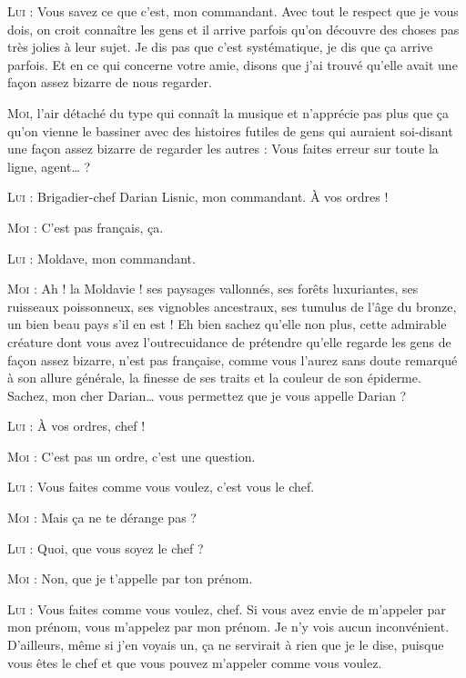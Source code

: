 \begin{dialogue}
\textsc{Lui} : Vous savez ce que c’est, mon commandant. Avec tout le respect que je vous dois, on croit connaître les gens et il arrive parfois qu’on découvre des choses pas très jolies à leur sujet. Je dis pas que c’est systématique, je dis que ça arrive parfois. Et en ce qui concerne votre amie, disons que j’ai trouvé qu’elle avait une façon assez bizarre de nous regarder.

\textsc{Moi}, l’air détaché du type qui connaît la musique et n’apprécie pas plus que ça qu’on vienne le bassiner avec des histoires futiles de gens qui auraient soi-disant une façon assez bizarre de regarder les autres : Vous faites erreur sur toute la ligne, agent… ?

\illusloflabel{}%
%
%
\textsc{Lui} : Brigadier-chef Darian Lisnic, mon commandant. À vos ordres !

\textsc{Moi} : C’est pas français, ça.

\textsc{Lui} : Moldave, mon commandant.

\textsc{Moi} : Ah ! la Moldavie ! ses paysages vallonnés, ses forêts luxuriantes, ses ruisseaux poissonneux, ses vignobles ancestraux, ses tumulus de l’âge du bronze, un bien beau pays s’il en est ! Eh bien sachez qu’elle non plus, cette admirable créature dont vous avez l’outrecuidance de prétendre qu’elle regarde les gens de façon assez bizarre, n’est pas française, comme vous l’aurez sans doute remarqué à son allure générale, la finesse de ses traits et la couleur de son épiderme. Sachez, mon cher Darian… vous permettez que je vous appelle Darian ?

\textsc{Lui} : À vos ordres, chef !

\textsc{Moi} : C’est pas un ordre, c’est une question.

\textsc{Lui} : Vous faites comme vous voulez, c’est vous le chef.

\textsc{Moi} : Mais ça ne te dérange pas ?

\textsc{Lui} : Quoi, que vous soyez le chef ?

\textsc{Moi} : Non, que je t’appelle par ton prénom.

\textsc{Lui} : Vous faites comme vous voulez, chef. Si vous avez envie de m’appeler par mon prénom, vous m’appelez par mon prénom. Je n’y vois aucun inconvénient. D’ailleurs, même si j’en voyais un, ça ne servirait à rien que je le dise, puisque vous êtes le chef et que vous pouvez m’appeler comme vous voulez.


\end{dialogue}

